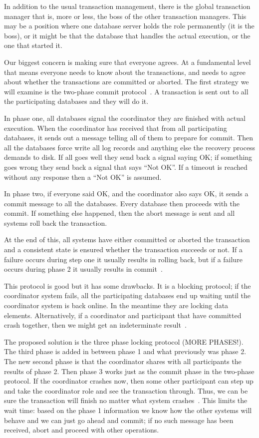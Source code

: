 In addition to the usual transaction management, there is the global transaction manager that is, more or less, the boss of the other transaction managers. This may be a position where one database server holds the role permanently (it is the boss), or it might be that the database that handles the actual execution, or the one that started it.

Our biggest concern is making sure that everyone agrees. At a fundamental level that means everyone needs to know about the transactions, and needs to agree about whether the transactions are committed or aborted. The first strategy we will examine is the two-phase commit protocol~\cite{fds}. A transaction is sent out to all the participating databases and they will do it.

In phase one, all databases signal the coordinator they are finished with actual execution. When the coordinator has received that from all participating databases, it sends out a message telling all of them to prepare for commit. Then all the databases force write all log records and anything else the recovery process demands to disk. If all goes well they send back a signal saying OK; if something goes wrong they send back a signal that says ``Not OK''. If a timeout is reached without any response then a ``Not OK'' is assumed.

In phase two, if everyone said OK, and the coordinator also says OK, it sends a commit message to all the databases. Every database then proceeds with the commit. If something else happened, then the abort message is sent and all systems roll back the transaction. 

At the end of this, all systems have either committed or aborted the transaction and a consistent state is ensured whether the transaction succeeds or not. If a failure occurs during step one it usually results in rolling back, but if a failure occurs during phase 2 it usually results in commit~\cite{fds}.

This protocol is good but it has some drawbacks. It is a blocking protocol; if the coordinator system fails, all the participating databases end up waiting until the coordinator system is back online. In the meantime they are locking data elements. Alternatively, if a coordinator and participant that have committed crash together, then we might get an indeterminate result~\cite{fds}.

The proposed solution is the three phase locking protocol (MORE PHASES!). The third phase is added in between phase 1 and what previously was phase 2. The new second phase is that the coordinator shares with all participants the results of phase 2. Then phase 3 works just as the commit phase in the two-phase protocol. If the coordinator crashes now, then some other participant can step up and take the coordinator role and see the transaction through. Thus, we can be sure the transaction will finish no matter what system crashes~\cite{fds}. This limits the wait time: based on the phase 1 information we know how the other systems will behave and we can just go ahead and commit; if no such message has been received, abort and proceed with other operations.




